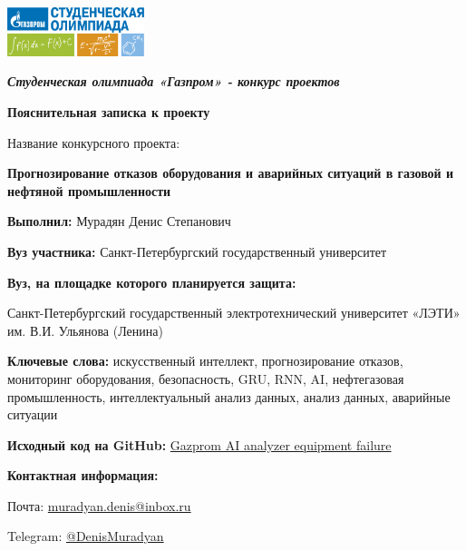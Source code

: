 \documentclass[a4paper,12pt]{article}
\begin{document}
\begin{titlepage}
    \begin{center}
        \includegraphics[width=0.3\textwidth]{../Include/logo.png}\\[1cm]

        {\itshape\Large\bfseries Студенческая олимпиада «Газпром» - конкурс проектов\par}
        \vspace{0.5cm}

        {\Large\bfseries Пояснительная записка к проекту\par}
        \vspace{2cm}

        {\large Название конкурсного проекта: \par}
        \vspace{0.3cm}

        {\LARGE\bfseries Прогнозирование отказов оборудования и аварийных ситуаций в газовой и нефтяной промышленности\par}
        \vspace{0.5cm}

    \end{center}

    \begin{flushleft}
        {\normalsize
        \textbf{Выполнил:} Мурадян Денис Степанович\par
        \vspace{0.3cm}
        \textbf{Вуз участника:} Санкт-Петербургский государственный университет\par
        \vspace{0.3cm}
        \textbf{Вуз, на площадке которого планируется защита:} \par
        Санкт-Петербургский государственный электротехнический университет «ЛЭТИ» им. В.И. Ульянова (Ленина)\par
        \vspace{0.3cm}
        \textbf{Ключевые слова:} искусственный интеллект, прогнозирование отказов, мониторинг оборудования, безопасность,
            GRU, RNN, AI, нефтегазовая промышленность, интеллектуальный анализ данных, анализ данных, аварийные ситуации\par
        \textbf{Исходный код на GitHub:}  \href{https://github.com/Denigmma/Gazprom_AI_analyzer_equipment_failure}{Gazprom AI analyzer equipment failure}\par
        \textbf{Контактная информация:}\par
        \quad Почта: \href{mailto:muradyan.denis@inbox.ru}{muradyan.denis@inbox.ru}\par
        \quad Telegram: \href{https://t.me/DenisMuradyan}{@DenisMuradyan}\par
        }
    \end{flushleft}


\end{titlepage}
\end{document}
